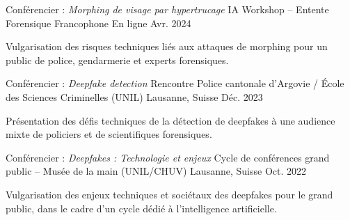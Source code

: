 
\begin{cventries}
\cventry
    {Conférencier : \emph{Morphing de visage par hypertrucage}} %
    {IA Workshop -- Entente Forensique Francophone} %
    {En ligne} %
    {Avr. 2024} %
    {
\begin{cvitems}
\item {Vulgarisation des risques techniques liés aux attaques de morphing pour un public de police, gendarmerie et experts forensiques.}
\end{cvitems}
    }
\cventry
    {Conférencier : \emph{Deepfake detection}} %
    {Rencontre Police cantonale d'Argovie / École des Sciences Criminelles (UNIL)} %
    {Lausanne, Suisse} %
    {Déc. 2023} %
    {
\begin{cvitems}
\item {Présentation des défis techniques de la détection de deepfakes à une audience mixte de policiers et de scientifiques forensiques.}
\end{cvitems}
    }
\cventry
    {Conférencier : \emph{Deepfakes : Technologie et enjeux}} %
    {Cycle de conférences grand public -- Musée de la main (UNIL/CHUV)} %
    {Lausanne, Suisse} %
    {Oct. 2022} %
    {
\begin{cvitems}
\item {Vulgarisation des enjeux techniques et sociétaux des deepfakes pour le grand public, dans le cadre d'un cycle dédié à l'intelligence artificielle.}
\end{cvitems}
    }
\end{cventries}

